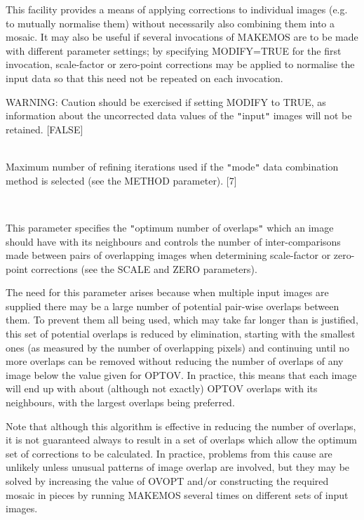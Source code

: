 \documentclass[twoside,11pt]{article}
\renewcommand{\_}{\texttt{\symbol{95}}}
\newcommand{\qt}[1]{{\tt "}#1{\tt "}}
\newcommand{\routine}[1]{{\sc #1}}
\newcommand{\sstsubsection}[1]{ \item[{#1}] \mbox{} \\}
\newcommand{\sstsubsection}[1]{\item[{#1}]}
\begin{document}
{{{         This facility provides a means of applying corrections to
         individual images (e.g. to mutually normalise them) without
         necessarily also combining them into a mosaic. It may also be
         useful if several invocations of \routine{MAKEMOS} are to be made with
         different parameter settings; by specifying MODIFY=TRUE for
         the first invocation, scale-factor or zero-point corrections
         may be applied to normalise the input data so that this need
         not be repeated on each invocation.

         WARNING: Caution should be exercised if setting MODIFY to
         TRUE, as information about the uncorrected data values of the
         \qt{input} images will not be retained.
         [FALSE]
      }
      \sstsubsection{
         NITER = \_REAL (Read)
      } {
         Maximum number of refining iterations used if the \qt{mode} data
         combination method is selected (see the METHOD parameter).
         [7]
      }
      \sstsubsection{
         OPTOV = \_INTEGER (Read)
      } {
         This parameter specifies the \qt{optimum number of overlaps}
         which an image should have with its neighbours and controls the
         number of inter-comparisons made between pairs of overlapping
         images when determining scale-factor or zero-point corrections
         (see the SCALE and ZERO parameters).

         The need for this parameter arises because when multiple input
         images are supplied there may be a large number of potential
         pair-wise overlaps between them.  To prevent them all being
         used, which may take far longer than is justified, this set of
         potential overlaps is reduced by elimination, starting with
         the smallest ones (as measured by the number of overlapping
         pixels) and continuing until no more overlaps can be removed
         without reducing the number of overlaps of any image below the
         value given for OPTOV.  In practice, this means that each image
         will end up with about (although not exactly) OPTOV overlaps
         with its neighbours, with the largest overlaps being
         preferred.

         Note that although this algorithm is effective in reducing the
         number of overlaps, it is not guaranteed always to result in a
         set of overlaps which allow the optimum set of corrections to
         be calculated. In practice, problems from this cause are
         unlikely unless unusual patterns of image overlap are involved,
         but they may be solved by increasing the value of OVOPT and/or
         constructing the required mosaic in pieces by running \routine{MAKEMOS}
         several times on different sets of input images.

}}}
\end{document}
